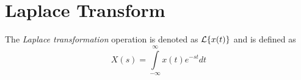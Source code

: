 \section{Laplace Transform}\label{app:Laplace_Transform}
\begin{definition}\label{def:Laplace_Transform}
  The \emph{Laplace transformation} operation is denoted as $\operatorname{\mathcal{L}} \lbrace x(t) \rbrace$ and is defined as
  \begin{equation}\label{eq:Laplace_Transform}
    X(s) = \int\limits_{-\infty}^{\infty} x(t) e^{-st} dt
  \end{equation}
\end{definition}
